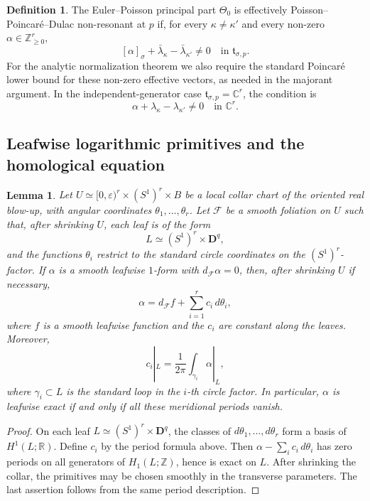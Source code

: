 \documentclass[11pt]{amsart}
\theoremstyle{plain}
\newtheorem{lemma}[theorem]{Lemma}
\theoremstyle{definition}
\newtheorem{definition}[theorem]{Definition}
\newcommand{\fol}{\mathcal{F}}
\newcommand{\ZZ}{\mathbb Z}
\theoremstyle{definition}
\newcommand{\C}{\mathbb{C}}
\begin{document}
\begin{definition}\label{def:nonres}
The Euler--Poisson principal part $\Theta_0$ is effectively
Poisson--Poincar\'e--Dulac non-resonant at $p$ if, for every
$\kappa\neq\kappa'$ and every non-zero $\alpha\in\ZZ_{\ge0}^r$,
\[
        [\alpha]_\sigma
        +
        \bar\lambda_\kappa
        -
        \bar\lambda_{\kappa'}
        \neq
        0
        \quad\text{in }\mathfrak t_{\sigma,p}.
\]
For the analytic normalization theorem we also require the standard Poincar\'e
lower bound for these non-zero effective vectors, as needed in the majorant
argument.  In the independent-generator case $\mathfrak t_{\sigma,p}=\C^r$, the
condition is
\[
        \alpha+\lambda_\kappa-\lambda_{\kappa'}\neq0
        \quad\text{in }\C^r .
\]
\end{definition}

\subsection{Leafwise logarithmic primitives and the homological equation}

\begin{lemma}\label{lem:leafwise-log-poincare}
Let $U\simeq [0,\varepsilon)^r\times(S^1)^r\times B$ be a local collar chart
of the oriented real blow-up, with angular coordinates
$\theta_1,\ldots,\theta_r$.  Let $\fol$ be a smooth foliation on $U$ such that,
after shrinking $U$, each leaf is of the form
\[
        L\simeq (S^1)^r\times\mathbf D^q,
\]
and the functions $\theta_i$ restrict to the standard circle coordinates on
the $(S^1)^r$-factor.  If $\alpha$ is a smooth leafwise $1$-form with
$d_\fol\alpha=0$, then, after shrinking $U$ if necessary,
\[
        \alpha=d_\fol f+\sum_{i=1}^r c_i\,d\theta_i,
\]
where $f$ is a smooth leafwise function and the $c_i$ are constant along the
leaves.  Moreover,
\[
        c_i|_L
        =
        \frac{1}{2\pi}\int_{\gamma_i}\alpha|_L,
\]
where $\gamma_i\subset L$ is the standard loop in the $i$-th circle factor.
In particular, $\alpha$ is leafwise exact if and only if all these meridional
periods vanish.
\end{lemma}

\begin{proof}
On each leaf $L\simeq(S^1)^r\times\mathbf D^q$, the classes of
$d\theta_1,\ldots,d\theta_r$ form a basis of $H^1(L;\mathbb R)$.  Define $c_i$
by the period formula above.  Then $\alpha-\sum_i c_i\,d\theta_i$ has zero
periods on all generators of $H_1(L;\mathbb Z)$, hence is exact on $L$.  After
shrinking the collar, the primitives may be chosen smoothly in the transverse
parameters.  The last assertion follows from the same period description.
\end{proof}
\end{document}
